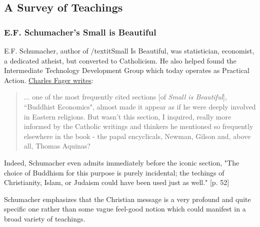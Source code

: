 \documentclass[letterpaper]{article}
\begin{document}
\fi

\subsection{A Survey of Teachings}

\subsubsection{E.F. Schumacher's Small is Beautiful}

E.F. Schumacher, author of /textit{Small Is Beautiful}, was statistician, economist, a dedicated atheist, but converted to Catholicism. He also helped found the Intermediate Technology Development Group which today operates as Practical Action. \href{https://www.religion-online.org/article/small-is-beautiful-and-so-is-rome-surprising-faith-of-e-f-schumacher/}{Charles Fager writes}:

\begin{quote}
... one of the most frequently cited sections [of \textit{Small is Beautiful}], ``Buddhist Economics", almost made it appear as if he were deeply involved in Eastern religions. But wasn't this section, I inquired, really more informed by the Catholic writings and thinkers he mentioned so frequently elsewhere in the book - the papal encyclicals, Newman, Gilson and, above all, Thomas Aquinas?
\end{quote}

Indeed, Schumacher even admits immediately before the iconic section, "The choice of Buddhism for this purpose is purely incidental; the techings of Christianity, Islam, or Judaism could have been used just as well." [p. 52]


Schumacher emphasizes that the Christian message is a very profound and quite specific one rather than some vague feel-good notion which could manifest in a broad variety of teachings.
\end{document}
